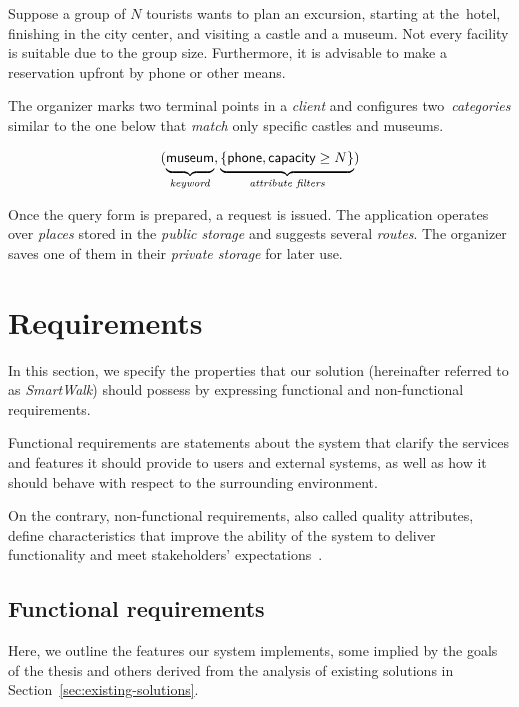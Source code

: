Suppose a group of $N$ tourists wants to plan an excursion, starting at the~hotel, finishing in the city center, and visiting a castle and a museum. Not every facility is suitable due to the group size. Furthermore, it is advisable to make a reservation upfront by phone or other means.

The organizer marks two terminal points in a \emph{client} and configures two~\emph{cate\-gories} similar to the one below that \emph{match} only specific castles and museums.

\begin{equation*}
(
  \underbrace{\strut \textsf{museum}}_{\text{\emph{keyword}}},
  \underbrace{\strut \{ \textsf{phone}, \textsf{capacity} \geq N \}}_{\text{\emph{attribute filters}}}
)
\end{equation*}

Once the query form is prepared, a request is issued. The application operates over \emph{places} stored in the \emph{public storage} and suggests several \emph{routes}. The organizer saves one of them in their \emph{private storage} for later use.

\section{Requirements}\label{sec:requirements}

In this section, we specify the properties that our solution (hereinafter referred to as \emph{SmartWalk}) should possess by expressing functional and non-functional requirements.

Functional requirements are statements about the system that clarify the services and features it should provide to users and external systems, as well as how it should behave with respect to the surrounding environment.

On the contrary, non-functional requirements, also called quality attributes, define characteristics that improve the ability of the system to deliver functionality and meet stakeholders' expectations~\cite{glinz07}.

\subsection{Functional requirements}\label{ssec:functional-requirements}

Here, we outline the features our system implements, some implied by the goals of the thesis and others derived from the analysis of existing solutions in Section~\ref{sec:existing-solutions}.

